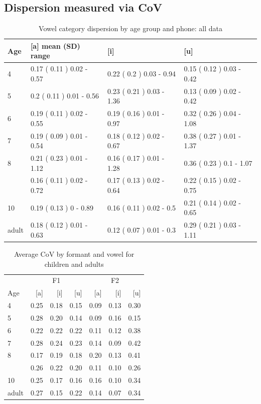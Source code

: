\documentclass[
]{article}
\begin{document}
\hypertarget{dispersion-measured-via-cov}{%
\subsection{Dispersion measured via CoV}\label{dispersion-measured-via-cov}}

\begin{table}

\caption{\label{tab:delta-disp-tbl-group-alldata}Vowel category dispersion by age group and phone: all data}
\centering
\begin{tabular}[t]{llll}
\toprule
Age & [a] mean (SD) range & [i] & [u]\\
\midrule
4 & 0.17 ( 0.11 ) 0.02 - 0.57 & 0.22 ( 0.2 ) 0.03 - 0.94 & 0.15 ( 0.12 ) 0.03 - 0.42\\
5 & 0.2 ( 0.11 ) 0.01 - 0.56 & 0.23 ( 0.21 ) 0.03 - 1.36 & 0.13 ( 0.09 ) 0.02 - 0.42\\
6 & 0.19 ( 0.11 ) 0.02 - 0.55 & 0.19 ( 0.16 ) 0.01 - 0.97 & 0.32 ( 0.26 ) 0.04 - 1.08\\
7 & 0.19 ( 0.09 ) 0.01 - 0.54 & 0.18 ( 0.12 ) 0.02 - 0.67 & 0.38 ( 0.27 ) 0.01 - 1.37\\
8 & 0.21 ( 0.23 ) 0.01 - 1.12 & 0.16 ( 0.17 ) 0.01 - 1.28 & 0.36 ( 0.23 ) 0.1 - 1.07\\
\addlinespace
9 & 0.16 ( 0.11 ) 0.02 - 0.72 & 0.17 ( 0.13 ) 0.02 - 0.64 & 0.22 ( 0.15 ) 0.02 - 0.75\\
10 & 0.19 ( 0.13 ) 0 - 0.89 & 0.16 ( 0.11 ) 0.02 - 0.5 & 0.21 ( 0.14 ) 0.02 - 0.65\\
adult & 0.18 ( 0.12 ) 0.01 - 0.63 & 0.12 ( 0.07 ) 0.01 - 0.3 & 0.29 ( 0.21 ) 0.03 - 1.11\\
\bottomrule
\end{tabular}
\end{table}

\begin{table}[!h]

\caption{\label{tab:delta-disp-tbl-group}Average CoV by formant and vowel for children and adults}
\centering
\begin{tabular}[t]{lrrrrrr}
\toprule
\multicolumn{1}{c}{ } & \multicolumn{3}{c}{F1} & \multicolumn{3}{c}{F2} \\
\cmidrule(l{3pt}r{3pt}){2-4} \cmidrule(l{3pt}r{3pt}){5-7}
Age & [a] & [i] & [u] & [a]  & [i]  & [u] \\
\midrule
4 & 0.25 & 0.18 & 0.15 & 0.09 & 0.13 & 0.30\\
5 & 0.28 & 0.20 & 0.14 & 0.09 & 0.16 & 0.15\\
6 & 0.22 & 0.22 & 0.22 & 0.11 & 0.12 & 0.38\\
7 & 0.28 & 0.24 & 0.23 & 0.14 & 0.09 & 0.42\\
8 & 0.17 & 0.19 & 0.18 & 0.20 & 0.13 & 0.41\\
\addlinespace
9 & 0.26 & 0.22 & 0.20 & 0.11 & 0.10 & 0.26\\
10 & 0.25 & 0.17 & 0.16 & 0.16 & 0.10 & 0.34\\
adult & 0.27 & 0.15 & 0.22 & 0.14 & 0.07 & 0.34\\
\bottomrule
\end{tabular}
\end{table}
\end{document}

